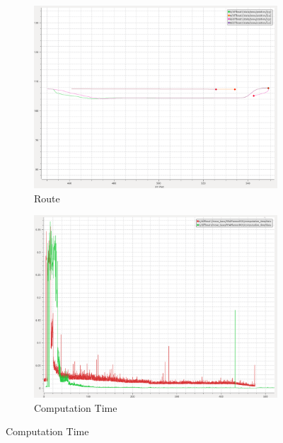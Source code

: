         \begin{figure}[H]
        \centering
        
            \begin{subfigure}[b]{0.45\textwidth}
                \centering
                \includegraphics[width=\textwidth]{figs/Chap5/plot_ov_w_vs_wo.png}
                \caption{Route}
                \label{fig:plot_ov_w_vs_wo}
            \end{subfigure}
            \begin{subfigure}[b]{0.45\textwidth}
                \centering
                \includegraphics[width=\textwidth]{figs/Chap5/plot_ov_w_vs_wo_CT.png}
                \caption{Computation Time}
                \label{fig:plot_ov_w_vs_wo_CT}
            \end{subfigure}
            

\end{figure}
